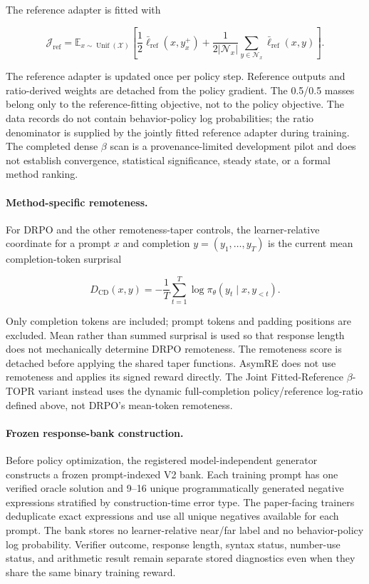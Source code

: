\documentclass{article}
\theoremstyle{plain}
\theoremstyle{definition}
\theoremstyle{remark}
\begin{document}
The reference adapter is fitted with

\[
\mathcal J_{\mathrm{ref}}
=
\mathbb E_{x\sim\operatorname{Unif}(\mathcal X)}
\left[
\frac{1}{2}\bar{\ell}_{\mathrm{ref}}(x,y_x^+)
+
\frac{1}{2|\mathcal N_x|}
\sum_{y\in\mathcal N_x}
\bar{\ell}_{\mathrm{ref}}(x,y)
\right].
\]

The reference adapter is updated once per policy step. Reference
outputs and ratio-derived weights are detached from the policy
gradient. The 0.5/0.5 masses belong only to the reference-fitting
objective, not to the policy objective. The data records do not contain
behavior-policy log probabilities; the ratio denominator is supplied by
the jointly fitted reference adapter during training. The completed
dense \(\beta\) scan is a provenance-limited development pilot and does
not establish convergence, statistical significance, steady state, or
a formal method ranking.

\paragraph{Method-specific remoteness.}

For DRPO and the other remoteness-taper controls, the learner-relative
coordinate for a prompt \(x\) and completion
\(y=(y_1,\ldots,y_T)\) is the current mean completion-token surprisal

\[
D_{\mathrm{CD}}(x,y)
=
-\frac{1}{T}
\sum_{t=1}^{T}
\log
\pi_\theta
\left(
y_t\mid x,y_{<t}
\right).
\]

Only completion tokens are included; prompt tokens and padding positions
are excluded. Mean rather than summed surprisal is used so that response
length does not mechanically determine DRPO remoteness. The remoteness
score is detached before applying the shared taper functions. AsymRE
does not use remoteness and applies its signed reward directly. The
Joint Fitted-Reference \(\beta\)-TOPR variant instead uses the dynamic
full-completion policy/reference log-ratio defined above, not DRPO's
mean-token remoteness.

\paragraph{Frozen response-bank construction.}

Before policy optimization, the registered model-independent generator
constructs a frozen prompt-indexed V2 bank. Each training prompt has one
verified oracle solution and 9--16 unique programmatically generated
negative expressions stratified by construction-time error type. The
paper-facing trainers deduplicate exact expressions and use all unique
negatives available for each prompt. The bank stores no learner-relative
near/far label and no behavior-policy log probability. Verifier outcome,
response length, syntax status, number-use status, and arithmetic result
remain separate stored diagnostics even when they share the same binary
training reward.
\end{document}
